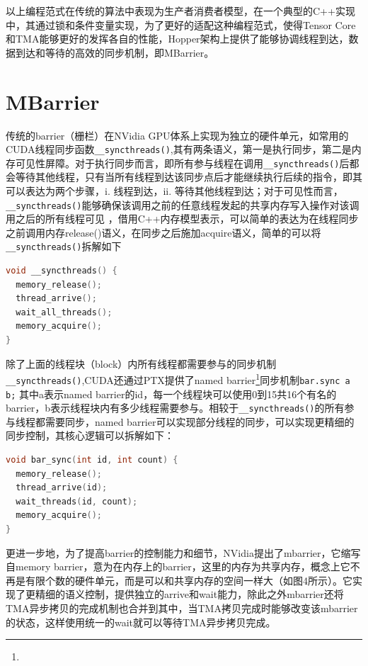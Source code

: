 以上编程范式在传统的算法中表现为生产者消费者模型，在一个典型的C++实现中，其通过锁和条件变量实现，为了更好的适配这种编程范式，使得Tensor Core和TMA能够更好的发挥各自的性能，Hopper架构上提供了能够协调线程到达，数据到达和等待的高效的同步机制，即MBarrier。

\section{MBarrier}

传统的barrier（栅栏）在NVidia GPU体系上实现为独立的硬件单元，如常用的CUDA线程同步函数\lstinline|__syncthreads()|,其有两条语义，第一是执行同步，第二是内存可见性屏障。对于执行同步而言，即所有参与线程在调用\lstinline|__syncthreads()|后都会等待其他线程，只有当所有线程到达该同步点后才能继续执行后续的指令，即其可以表达为两个步骤，i. 线程到达，ii. 等待其他线程到达；对于可见性而言，\lstinline|__syncthreads()|能够确保该调用之前的任意线程发起的共享内存写入操作对该调用之后的所有线程可见 ，借用C++内存模型表示，可以简单的表达为在线程同步之前调用内存release()语义，在同步之后施加acquire语义，简单的可以将\lstinline|__syncthreads()|拆解如下

\begin{lstlisting}[language=C++]
void __syncthreads() {
  memory_release();
  thread_arrive();
  wait_all_threads();
  memory_acquire();
}
\end{lstlisting}

除了上面的线程块（block）内所有线程都需要参与的同步机制\lstinline|__syncthreads()|,CUDA还通过PTX提供了named barrier\footnote{\reedVIIIurlA}同步机制\lstinline|bar.sync a b;| 其中a表示named barrier的id，每一个线程块可以使用0到15共16个有名的barrier，b表示线程块内有多少线程需要参与。相较于\lstinline|__syncthreads()|的所有参与线程都需要同步，named barrier可以实现部分线程的同步，可以实现更精细的同步控制，其核心逻辑可以拆解如下：

\begin{lstlisting}[language=C++]
void bar_sync(int id, int count) {
  memory_release();
  thread_arrive(id);
  wait_threads(id, count);
  memory_acquire();
}
\end{lstlisting}

更进一步地，为了提高barrier的控制能力和细节，NVidia提出了mbarrier，它缩写自memory barrier，意为在内存上的barrier，这里的内存为共享内存，概念上它不再是有限个数的硬件单元，而是可以和共享内存的空间一样大（如图4所示）。它实现了更精细的语义控制，提供独立的arrive和wait能力，除此之外mbarrier还将TMA异步拷贝的完成机制也合并到其中，当TMA拷贝完成时能够改变该mbarrier的状态，这样使用统一的wait就可以等待TMA异步拷贝完成。

